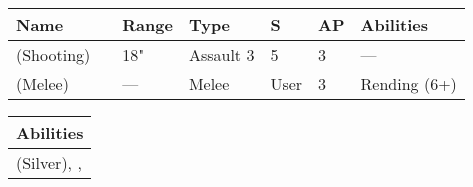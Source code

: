 \noindent
\begin{tabular}{||m{110pt} m{30pt} m{31pt} m{55pt} m{12pt} m{12pt} m{210pt}||}
	\hline
	Name & & Range & Type & S & AP & Abilities \\
	\hline
	\quickref{Staff of Light} (Shooting) & & 18" & Assault 3 & 5 & 3 & — \\
	\quickref{Staff of Light} (Melee) & & — & Melee & User & 3 & Rending (6+) \\
	\hline
\end{tabular}

\noindent
\begin{tabular}{||m{532pt}||}
	\hline
	Abilities \\
	\hline
	\quickref{Awakening Protocols}(Silver), \quickref{Living Metal}, \quickref{Reanimation Protocols} \\
	\hline
\end{tabular}
